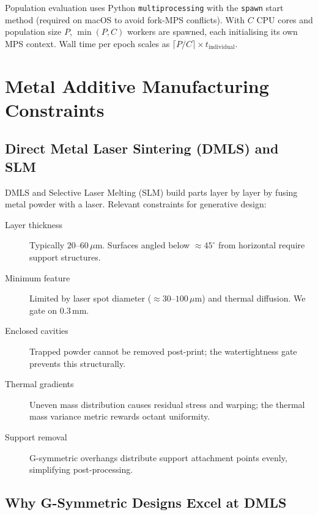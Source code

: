 \documentclass[11pt, a4paper]{article}
\begin{document}
Population evaluation uses Python \texttt{multiprocessing} with the
\texttt{spawn} start method (required on macOS to avoid fork-MPS conflicts).
With $C$ CPU cores and population size $P$, $\min(P, C)$ workers are spawned,
each initialising its own MPS context. Wall time per epoch scales as
$\lceil P / C \rceil \times t_{\mathrm{individual}}$.

\section{Metal Additive Manufacturing Constraints}
\label{sec:print}

\subsection{Direct Metal Laser Sintering (DMLS) and SLM}

DMLS and Selective Laser Melting (SLM) build parts layer by layer by fusing
metal powder with a laser. Relevant constraints for generative design:

\begin{description}
  \item[Layer thickness] Typically $20$--$60\,\mu\mathrm{m}$. Surfaces
    angled below $\approx 45^\circ$ from horizontal require support structures.
  \item[Minimum feature] Limited by laser spot diameter ($\approx 30$--$100\,\mu\mathrm{m}$) and thermal diffusion. We gate on $0.3\,\mathrm{mm}$.
  \item[Enclosed cavities] Trapped powder cannot be removed post-print; the watertightness gate prevents this structurally.
  \item[Thermal gradients] Uneven mass distribution causes residual stress and warping; the thermal mass variance metric rewards octant uniformity.
  \item[Support removal] G-symmetric overhangs distribute support attachment points evenly, simplifying post-processing.
\end{description}

\subsection{Why G-Symmetric Designs Excel at DMLS}
\end{document}

